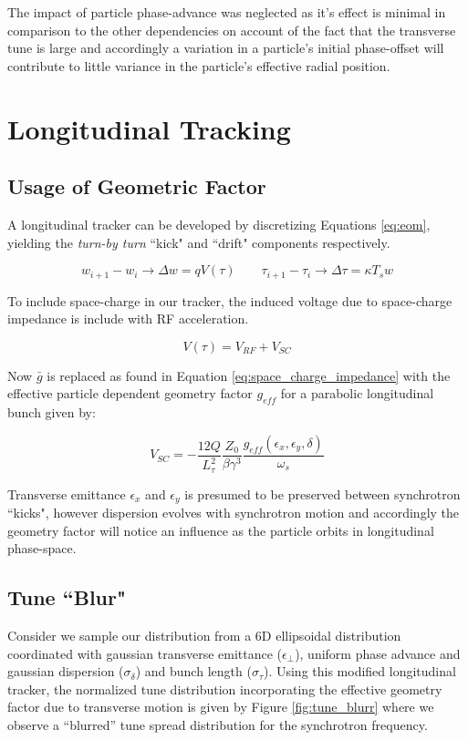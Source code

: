 The impact of particle phase-advance was neglected as it's effect is minimal in comparison to the other dependencies on account of the fact that the transverse tune is large and accordingly a variation in a particle's initial phase-offset will contribute to little variance in the particle's effective radial position.

\section{Longitudinal Tracking}

\subsection{Usage of Geometric Factor}

A longitudinal tracker can be developed by discretizing Equations \ref{eq:eom}, yielding the \textit{turn-by turn} ``kick" and ``drift" components respectively.

$$w_{i+1}-w_i \to \Delta w = qV(\tau) \qquad \tau_{i+1}-\tau_i \to \Delta\tau = \kappa T_s w$$

To include space-charge in our tracker, the induced voltage due to space-charge impedance is include with RF acceleration.

$$V(\tau) = V_{RF} + V_{SC}$$

Now $\bar{g}$ is replaced as found in Equation \ref{eq:space_charge_impedance} with the effective particle dependent geometry factor $g_{eff}$ for a parabolic longitudinal bunch given by:

$$V_{SC} = -\frac{12Q}{L_\tau^2}\frac{Z_0}{\beta\gamma^3}\frac{g_{eff}(\epsilon_x,\epsilon_y,\delta)}{\omega_s}$$

Transverse emittance $\epsilon_x$ and $\epsilon_y$ is presumed to be preserved between synchrotron ``kicks", however dispersion evolves with synchrotron motion and accordingly the geometry factor will notice an influence as the particle orbits in longitudinal phase-space.

\subsection{Tune ``Blur"}

Consider we sample our distribution from a 6D ellipsoidal distribution coordinated with gaussian transverse emittance ($\epsilon_\perp$), uniform phase advance and gaussian dispersion ($\sigma_\delta$) and bunch length ($\sigma_\tau$). Using this modified longitudinal tracker, the normalized tune distribution incorporating the effective geometry factor due to transverse motion is given by Figure \ref{fig:tune_blurr} where we observe a ``blurred'' tune spread distribution for the synchrotron frequency.

